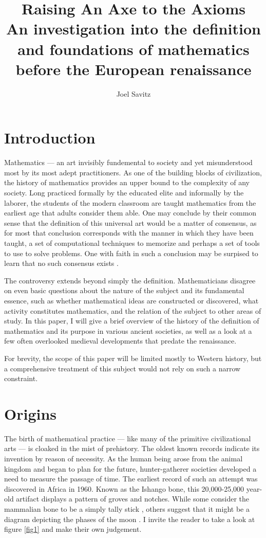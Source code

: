 \documentclass[12pt]{article}
\title{Raising An Axe to the Axioms \\ \small An investigation into the definition and foundations of mathematics before the European renaissance}
\author{Joel Savitz}
\begin{document}
\maketitle


\section{Introduction}

Mathematics ---
an art invisibly fundemental to society
and yet misunderstood most by its most adept practitioners.
As one of the building blocks of civilization,
the history of mathematics provides an upper bound
to the complexity of any society.
Long practiced formally by the educated elite
and informally by the laborer,
the students of the modern classroom
are taught mathematics from the earliest age
that adults consider them able.
One may conclude by their common sense
that the definition of this universal art
would be a matter of consensus,
as for most that conclusion corresponds
with the manner in which they have been taught,
a set of computational techniques to memorize and
perhaps a set of tools to use to solve problems.
One with faith in such a conclusion
may be surpised to learn that
no such consensus exists \cite{tobies}.

The controversy extends
beyond simply the definition.
Mathematicians disagree on even
basic questions
about the nature of the subject
and its fundamental essence,
such as whether mathematical ideas
are constructed or discovered,
what activity constitutes mathematics,
and the relation of the subject
to other areas of study.
In this paper,
I will give a brief overview
of the history of the definition of mathematics
and its purpose in various ancient societies,
as well as a look at a few often overlooked
medieval developments that predate the renaissance.

For brevity, the scope of this paper
will be limited mostly
to Western history,
but a comprehensive treatment of this subject
would not rely on such a narrow constraint.

\section{Origins}

The birth of mathematical practice
--- like many of the primitive civilizational arts ---
is cloaked in the mist of prehistory.
The oldest known records indicate its
invention by reason of necessity.
As the human being arose from the animal kingdom
and began to plan for the future,
hunter-gatherer societies developed
a need to measure the passage of time.
The earliest record of such an attempt
was discovered in Africa in 1960.
Known as the Ishango bone,
this 20,000-25,000 year-old artifact
displays a pattern of groves and notches.
While some consider the mammalian bone
to be a simply tally stick \cite{ishango},
others suggest that it might be a diagram
depicting the phases of the moon \cite{ishango2}.
I invite the reader to take a look at figure \ref{fig1}
and make their own judgement.
\end{document}
